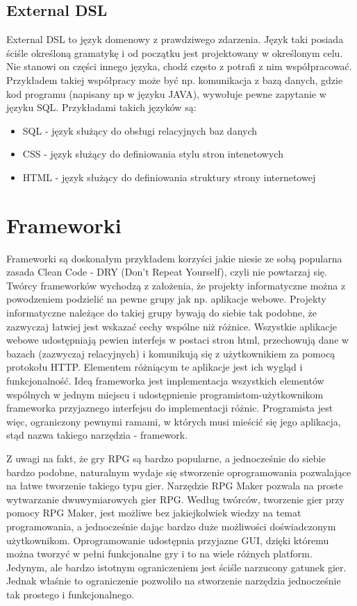\documentclass	{xmgr}
\begin{document}
\subsection{External DSL}

External DSL to język domenowy z prawdziwego zdarzenia. Język taki posiada ściśle określoną gramatykę i od początku jest projektowany w określonym celu. Nie stanowi on części innego języka, chodź często z potrafi z nim współpracować. Przykładem takiej współpracy może być np. komunikacja z bazą danych, gdzie kod programu (napisany np w języku JAVA), wywołuje pewne zapytanie w języku SQL. Przykładami takich języków są:
\begin{itemize}
	\item SQL - język służący do obsługi relacyjnych baz danych
	\item CSS - język służący do definiowania stylu stron intenetowych 
	\item HTML - język służący do definiowania struktury strony internetowej
\end{itemize}

\section{Frameworki}

Frameworki są doskonałym przykładem korzyści jakie niesie ze sobą popularna zasada Clean Code \cite{CleanCode:2005} - DRY (Don't Repeat Yourself), czyli nie powtarzaj się. 
Twórcy frameworków  wychodzą z założenia, że projekty informatyczne można z powodzeniem podzielić na pewne grupy jak np. aplikacje webowe. Projekty informatyczne należące do takiej grupy bywają do siebie tak podobne, że zazwyczaj łatwiej jest wskazać cechy wspólne niż różnice.
Wszystkie aplikacje webowe udostępniają pewien interfejs w postaci stron html, przechowują dane w bazach (zazwyczaj relacyjnych) i komunikują się z użytkownikiem za pomocą protokołu HTTP. Elementem różniącym te aplikacje jest ich wygląd i funkcjonalność. Ideą frameworka jest implementacja wszystkich elementów wspólnych w jednym miejscu i udostępnienie programistom-użytkownikom frameworka przyjaznego interfejsu do implementacji różnic. Programista jest więc, ograniczony pewnymi ramami, w których musi mieścić się jego aplikacja, stąd nazwa takiego narzędzia - framework.

Z uwagi na fakt, że gry RPG są bardzo popularne, a jednocześnie do siebie bardzo podobne, naturalnym wydaje się stworzenie oprogramowania pozwalające na łatwe tworzenie takiego typu gier. Narzędzie RPG Maker \cite{RPGMaker:2017:Doc} pozwala na proste wytwarzanie dwuwymiarowych gier RPG. Według twórców, tworzenie gier przy pomocy RPG Maker, jest możliwe bez jakiejkolwiek wiedzy na temat programowania, a jednocześnie dając bardzo duże możliwości doświadczonym użytkownikom. Oprogramowanie udostępnia przyjazne GUI, dzięki któremu można tworzyć w pełni funkcjonalne gry i to na wiele różnych platform. Jedynym, ale bardzo istotnym ograniczeniem jest ściśle narzucony gatunek gier. Jednak właśnie to ograniczenie pozwoliło na stworzenie narzędzia jednocześnie tak prostego i funkcjonalnego. 
\end{document}
